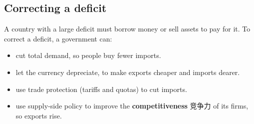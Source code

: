 \documentclass[11pt]{article}
\begin{document}
\subsection*{Correcting a deficit}

A country with a large deficit must borrow money or sell assets to pay for it. To correct a deficit, a government can:

\begin{itemize}
\item cut total demand, so people buy fewer imports.

\item let the currency depreciate, to make exports cheaper and imports dearer.

\item use trade protection (tariffs and quotas) to cut imports.

\item use supply-side policy to improve the \textbf{competitiveness} 竞争力 of its firms, so exports rise.

\end{itemize}
\end{document}
